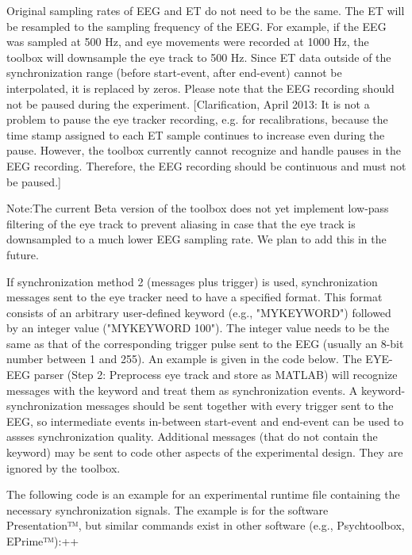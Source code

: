 Original sampling rates of EEG and ET do not need to be the same. The ET will be resampled to the sampling frequency of the EEG. For example, if the EEG was sampled at 500 Hz, and eye movements were recorded at 1000 Hz, the toolbox will downsample the eye track to 500 Hz. Since ET data outside of the synchronization range (before start-event, after end-event) cannot be interpolated, it is replaced by zeros. Please note that the EEG recording should not be paused during the experiment. [Clarification, April 2013: It is not a problem to pause the eye tracker recording, e.g. for recalibrations, because the time stamp assigned to each ET sample continues to increase even during the pause. However, the toolbox currently cannot recognize and handle pauses in the EEG recording. Therefore, the EEG recording should be continuous and must not be paused.]

Note:The current Beta version of the toolbox does not yet implement low-pass filtering of the eye track to prevent aliasing in case that the eye track is downsampled to a much lower EEG sampling rate. We plan to add this in the future.

If synchronization method 2 (messages plus trigger) is used, synchronization messages sent to the eye tracker need to have a specified format. This format consists of an arbitrary user-defined keyword (e.g., "MYKEYWORD") followed by an integer value ("MYKEYWORD 100"). The integer value needs to be the same as that of the corresponding trigger pulse sent to the EEG (usually an 8-bit number between 1 and 255). An example is given in the code below. The EYE-EEG parser (Step 2: Preprocess eye track and store as MATLAB) will recognize messages with the keyword and treat them as synchronization events. A keyword-synchronization messages should be sent together with every trigger sent to the EEG, so intermediate events in-between start-event and end-event can be used to assses synchronization quality. Additional messages (that do not contain the keyword) may be sent to code other aspects of the experimental design. They are ignored by the toolbox.

The following code is an example for an experimental runtime file containing the necessary synchronization signals. The example is for the software Presentation™, but similar commands exist in other software (e.g., Psychtoolbox, EPrime™):++


